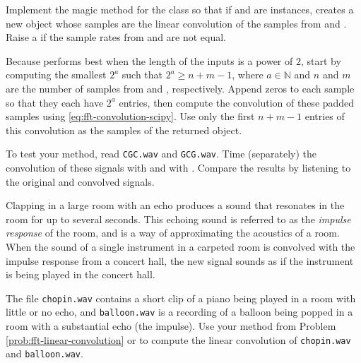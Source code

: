 \begin{problem} %
\item Implement the  magic method for the  class so that if  and  are  instances,  creates a new  object whose samples are the linear convolution of the samples from  and .
Raise a  if the sample rates from  and  are not equal.

Because  performs best when the length of the inputs is a power of $2$, start by computing the smallest $2^a$ such that $2^a \ge n + m - 1$, where $a\in\mathbb{N}$ and $n$ and $m$ are the number of samples from  and , respectively.
Append zeros to each sample so that they each have $2^a$ entries, then compute the convolution of these padded samples using \eqref{eq:fft-convolution-scipy}.
Use only the first $n + m - 1$ entries of this convolution as the samples of the returned  object.

To test your method, read \texttt{CGC.wav} and \texttt{GCG.wav}.
Time (separately) the convolution of these signals with  and with .
Compare the results by listening to the original and convolved signals.
\label{prob:fft-linear-convolution}
\end{problem}

\begin{problem} %
Clapping in a large room with an echo produces a sound that resonates in the room for up to several seconds.
This echoing sound is referred to as the \emph{impulse response} of the room, and is a way of approximating the acoustics of a room.
When the sound of a single instrument in a carpeted room is convolved with the impulse response from a concert hall, the new signal sounds as if the instrument is being played in the concert hall.

The file \texttt{chopin.wav} contains a short clip of a piano being played in a room with little or no echo, and \texttt{balloon.wav} is a recording of a balloon being popped in a room with a substantial echo (the impulse).
Use your method from Problem \ref{prob:fft-linear-convolution} or  to compute the linear convolution of \texttt{chopin.wav} and \texttt{balloon.wav}.
\end{problem}

